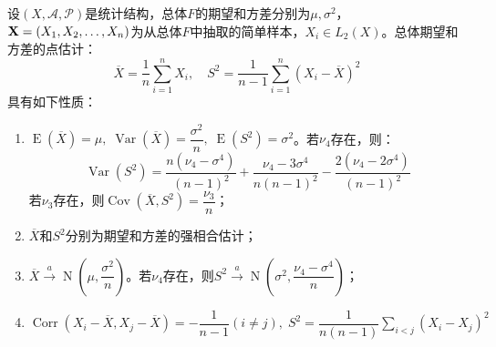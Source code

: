 \begin{property}
	设$(X,\mathscr{A},\mathscr{P})$是统计结构，总体$F$的期望和方差分别为$\mu,\sigma^2$，$\mathbf{X}=(X_1, X_2, \dots, X_{n})$为从总体$F$中抽取的简单样本，$X_i\in L_2(X)$。总体期望和方差的点估计：
	\begin{equation*}
		\overline{X}=\frac{1}{n}\sum_{i=1}^{n}X_i,\quad S^2=\frac{1}{n-1}\sum_{i=1}^{n}(X_i-\overline{X})^2
	\end{equation*}
	具有如下性质：
	\begin{enumerate}
		\item $\operatorname{E}(\overline{X})=\mu,\;\operatorname{Var}(\overline{X})=\dfrac{\sigma^2}{n},\;\operatorname{E}(S^2)=\sigma^2$。若$\nu_4$存在，则：
		\begin{equation*}
			\operatorname{Var}(S^2)=\frac{n(\nu_4-\sigma^4)}{(n-1)^2}+\frac{\nu_4-3\sigma^4}{n(n-1)^2}-\frac{2(\nu_4-2\sigma^4)}{(n-1)^2}
		\end{equation*}
		若$\nu_3$存在，则$\operatorname{Cov}(\overline{X},S^2)=\dfrac{\nu_3}{n}$；
		\item $\overline{X}$和$S^2$分别为期望和方差的强相合估计；
		\item $\overline{X}\overset{a}{\longrightarrow}\operatorname{N}\left(\mu,\dfrac{\sigma^2}{n}\right)$。若$\nu_4$存在，则$S^2\overset{a}{\longrightarrow}\operatorname{N}\left(\sigma^2,\dfrac{\nu_4-\sigma^4}{n}\right)$；
		\item $\operatorname{Corr}(X_i-\overline{X},X_j-\overline{X})=-\dfrac{1}{n-1}(i\ne j),\;S^2=\dfrac{1}{n(n-1)}\sum\limits_{i<j}^{}(X_i-X_j)^2$
	\end{enumerate}
\end{property}
